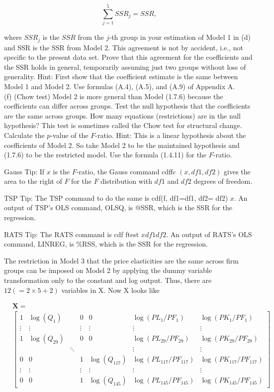 \documentclass[10pt]{article}
\begin{document}
$$
\sum_{j=1}^{5} S S R_{j}=S S R,
$$

where $S S R_{j}$ is the $S S R$ from the $j$-th group in your estimation of Model 1 in (d) and SSR is the SSR from Model 2. This agreement is not by accident, i.e., not specific to the present data set. Prove that this agreement for the coefficients and the SSR holds in general, temporarily assuming just two groups without loss of generality. Hint: First show that the coefficient estimate is the same between Model 1 and Model 2. Use formulas (A.4), (A.5), and (A.9) of Appendix A.\\
(f) (Chow test) Model 2 is more general than Model (1.7.6) because the coefficients can differ across groups. Test the null hypothesis that the coefficients are the same across groups. How many equations (restrictions) are in the null hypothesis? This test is sometimes called the Chow test for structural change. Calculate the $p$-value of the $F$-ratio. Hint: This is a linear hypothesis about the coefficients of Model 2. So take Model 2 to be the maintained hypothesis and (1.7.6) to be the restricted model. Use the formula (1.4.11) for the $F$-ratio.

Gauss Tip: If $x$ is the $F$-ratio, the Gauss command cdffc $(x, d f 1, d f 2)$ gives the area to the right of $F$ for the $F$ distribution with $d f 1$ and $d f 2$ degrees of freedom.

TSP Tip: The TSP command to do the same is cdf(f, df1=df1, df2= df2) $x$. An output of TSP's OLS command, OLSQ, is @SSR, which is the SSR for the regression.

RATS Tip: The RATS command is cdf ftest $x d f 1 d f 2$. An output of RATS's OLS command, LINREG, is \%RSS, which is the SSR for the regression.

The restriction in Model 3 that the price elasticities are the same across firm groups can be imposed on Model 2 by applying the dummy variable transformation only to the constant and log output. Thus, there are $12(=2 \times 5+2)$ variables in X. Now X looks like


\begin{align*}
& \mathbf{X}= \\
& {\left[\begin{array}{ccccccc}
1 & \log \left(Q_{1}\right) & & 0 & 0 & \log \left(P L_{1} / P F_{1}\right) & \log \left(P K_{1} / P F_{1}\right) \\
\vdots & \vdots & & \vdots & \vdots & \vdots & \vdots \\
1 & \log \left(Q_{29}\right) & & 0 & 0 & \log \left(P L_{29} / P F_{29}\right) & \log \left(P K_{29} / P F_{29}\right) \\
& & \ddots & & & \vdots & \vdots \\
0 & 0 & & 1 & \log \left(Q_{117}\right) & \log \left(P L_{117} / P F_{117}\right) & \log \left(P K_{117} / P F_{117}\right) \\
\vdots & \vdots & & \vdots & \vdots & \vdots & \vdots \\
0 & 0 & & 1 & \log \left(Q_{145}\right) & \log \left(P L_{145} / P F_{145}\right) & \log \left(P K_{145} / P F_{145}\right)
\end{array}\right]} \tag{**}
\end{align*}
\end{document}
